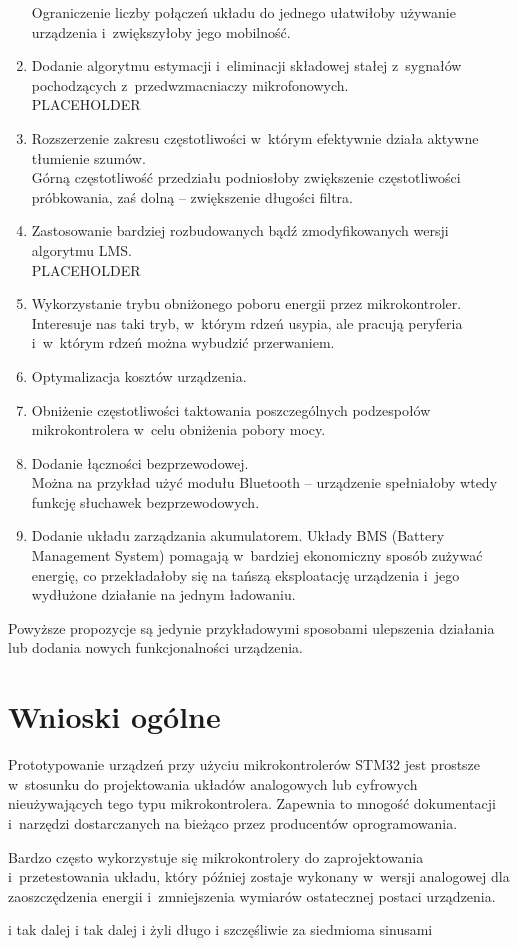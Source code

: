 \begin{enumerate}
\begin{itemize}
	\end{itemize}
	Ograniczenie liczby połączeń układu do jednego ułatwiłoby używanie urządzenia i~zwiększyłoby jego mobilność.
	\item Dodanie algorytmu estymacji i~eliminacji składowej stałej z~sygnałów pochodzących z~przedwzmacniaczy mikrofonowych.\\
	PLACEHOLDER
	\item Rozszerzenie zakresu częstotliwości w~którym efektywnie działa aktywne tłumienie szumów.\\
	Górną częstotliwość przedziału podniosłoby zwiększenie częstotliwości próbkowania, zaś dolną -- zwiększenie długości filtra.
	\item Zastosowanie bardziej rozbudowanych bądź zmodyfikowanych wersji algorytmu LMS.\\
	PLACEHOLDER
	\item Wykorzystanie trybu obniżonego poboru energii przez mikrokontroler.\\
	Interesuje nas taki tryb, w~którym rdzeń usypia, ale pracują peryferia i~w~którym rdzeń można wybudzić przerwaniem.
	\item Optymalizacja kosztów urządzenia.
	\item Obniżenie częstotliwości taktowania poszczególnych podzespołów mikrokontrolera w~celu obniżenia pobory mocy.
	\item Dodanie łączności bezprzewodowej.\\
	Można  na przykład użyć modułu Bluetooth -- urządzenie spełniałoby wtedy funkcję słuchawek bezprzewodowych.
	\item Dodanie układu zarządzania akumulatorem.
	Układy BMS (Battery Management System) pomagają w~bardziej ekonomiczny sposób zużywać energię, co przekładałoby się na tańszą eksploatację urządzenia i~jego wydłużone działanie na jednym ładowaniu.
\end{enumerate}

Powyższe propozycje są jedynie przykładowymi sposobami ulepszenia działania lub dodania nowych funkcjonalności urządzenia.
\section{Wnioski ogólne}
Prototypowanie urządzeń przy użyciu mikrokontrolerów STM32 jest prostsze w~stosunku do projektowania układów analogowych lub cyfrowych nieużywających tego typu mikrokontrolera. Zapewnia to mnogość dokumentacji i~narzędzi dostarczanych na bieżąco przez producentów oprogramowania.

Bardzo często wykorzystuje się mikrokontrolery do zaprojektowania i~przetestowania układu, który później zostaje wykonany w~wersji analogowej dla zaoszczędzenia energii i~zmniejszenia wymiarów ostatecznej postaci urządzenia.


i tak dalej i tak dalej i żyli długo i szczęśliwie za siedmioma sinusami